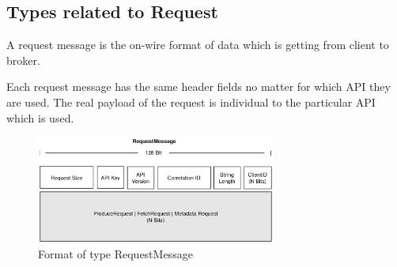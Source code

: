 \subsection{Types related to Request}
A request message is the on-wire format of data which is getting from client to
broker.

Each request message has the same header fields no matter for which API they are used. 
The real payload of the request is individual to the particular API which is
used.

\begin{figure}[H]
    \centering
    \includegraphics[width=0.7\textwidth]{images/impl-prot-types-requestMessage.png}
    \caption{Format of type RequestMessage}
    \label{fig:impl-prot-types-requestMessage}
\end{figure}

